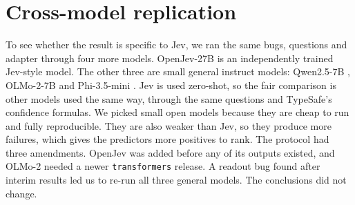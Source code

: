 \section{Cross-model replication}
\label{sec:crossmodel}

To see whether the result is specific to Jev, we ran the same bugs,
questions and adapter through four more models. OpenJev-27B \citep{openjev2026} is an
independently trained Jev-style model. The other three are small general
instruct models: Qwen2.5-7B \citep{qwen2024qwen25},
OLMo-2-7B \citep{olmo2024olmo2} and Phi-3.5-mini \citep{abdin2024phi3}.
Jev is used zero-shot, so the fair comparison is other models used the
same way, through the same questions and TypeSafe's confidence formulas.
We picked small open models because they are cheap to run and fully
reproducible. They are also weaker than Jev, so they produce more
failures, which gives the predictors more positives to rank. The protocol had three amendments. OpenJev was added before any of its
outputs existed, and OLMo-2 needed a newer \texttt{transformers}
release. A readout bug found after interim results led us to re-run all
three general models. The conclusions did not change.

\begin{colfigure}
\centering
{}
\caption{For all five models, the decision estimator ranks wrong
workflow actions better than the model's final-step confidence on the
500 held-out bugs. The intervals overlap only for OLMo-2.}
\label{fig:crossmodel}
\end{colfigure}

